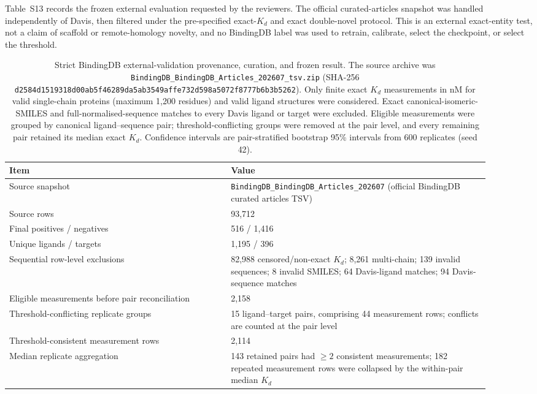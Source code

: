 \documentclass[11pt]{article}
\begin{document}
Table~S13 records the frozen external evaluation requested by the reviewers.
The official curated-articles snapshot was handled independently of Davis, then
filtered under the pre-specified exact-$K_d$ and exact double-novel protocol.
This is an external exact-entity test, not a claim of scaffold or remote-homology
novelty, and no BindingDB label was used to retrain, calibrate, select the
checkpoint, or select the threshold.

\begin{table}[H]
\centering
\small
\caption{Strict BindingDB external-validation provenance, curation, and frozen
result. The source archive was \texttt{BindingDB\_BindingDB\_Articles\_202607\_tsv.zip}
(SHA-256 \texttt{d2584d1519318d00ab5f46289da5ab3549affe732d598a5072f8777b6b3b5262}).
Only finite exact $K_d$ measurements in nM for valid single-chain proteins
(maximum 1,200 residues) and valid ligand structures were considered. Exact
canonical-isomeric-SMILES and full-normalised-sequence matches to every Davis
ligand or target were excluded. Eligible measurements were grouped by canonical
ligand--sequence pair; threshold-conflicting groups were removed at the pair
level, and every remaining pair retained its median exact $K_d$. Confidence
intervals are pair-stratified bootstrap 95\% intervals from 600 replicates
(seed 42).}
\label{tab:bindingdb_external_si}
\begin{tabular}{p{0.42\linewidth}p{0.49\linewidth}}
\toprule
Item & Value \\
\midrule
Source snapshot & \texttt{BindingDB\_BindingDB\_Articles\_202607} (official BindingDB curated articles TSV) \\
Source rows & 93,712 \\
Final positives / negatives & 516 / 1,416 \\
Unique ligands / targets & 1,195 / 396 \\
Sequential row-level exclusions & 82,988 censored/non-exact $K_d$; 8,261 multi-chain; 139 invalid sequences; 8 invalid SMILES; 64 Davis-ligand matches; 94 Davis-sequence matches \\
Eligible measurements before pair reconciliation & 2,158 \\
Threshold-conflicting replicate groups & 15 ligand--target pairs, comprising 44 measurement rows; conflicts are counted at the pair level \\
Threshold-consistent measurement rows & 2,114 \\
Median replicate aggregation & 143 retained pairs had $\geq2$ consistent measurements; 182 repeated measurement rows were collapsed by the within-pair median $K_d$ \\

\end{tabular}
\end{table}
\end{document}
